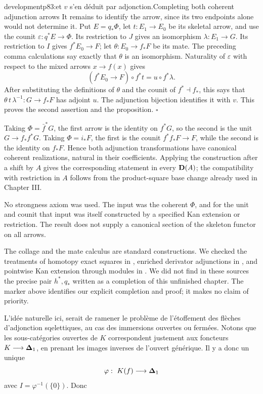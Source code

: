 \begin{dcomment}{development}{p83:et $v$ s'en déduit par adjonction.}{Completing both coherent adjunction arrows}
It remains to identify the arrow, since its two endpoints alone would not determine it. Put \(E=q_*\Phi\), let \(t:E_1\to E_0\) be its skeletal arrow, and use the counit
\(\varepsilon:q^*E\to\Phi\).
Its restriction to \(J\) gives an isomorphism \(\lambda:E_1\to G\). Its restriction to \(I\) gives \(f^*E_0\to F\); let \(\theta:E_0\to f_*F\) be its mate. The preceding comma calculations say exactly that \(\theta\) is an isomorphism. Naturality of \(\varepsilon\) with respect to the mixed arrows \(x\to f(x)\) gives
\[
 (f^*E_0\longrightarrow F)\circ f^*t
 =
 u\circ f^*\lambda.
\]
After substituting the definitions of \(\theta\) and the counit of \(f^*\dashv f_*\), this says that
\(\theta\,t\,\lambda^{-1}:G\to f_*F\)
has adjoint \(u\). The adjunction bijection identifies it with \(v\). This proves the second assertion and the proposition. \(\square\)

Taking \(\Phi=\bar f^*G\), the first arrow is the identity on \(f^*G\), so the second is the unit \(G\to f_*f^*G\). Taking \(\Phi=i_*F\), the first is the counit \(f^*f_*F\to F\), while the second is the identity on \(f_*F\). Hence both adjunction transformations have canonical coherent realizations, natural in their coefficients. Applying the construction after a shift by \(A\) gives the corresponding statement in every \(\mathbf{D}(A)\); the compatibility with restriction in \(A\) follows from the product-square base change already used in Chapter III.

No strongness axiom was used. The input was the coherent \(\Phi\), and for the unit and counit that input was itself constructed by a specified Kan extension or restriction. The result does not supply a canonical section of the skeleton functor on all arrows.

The collage and the mate calculus are standard constructions. We checked the treatments of homotopy exact squares in \citet[Section 1]{Groth2013}, enriched derivator adjunctions in \citet[Sections 8--9]{GrothPontoShulman2014Additivity}, and pointwise Kan extension through modules in \citet[Section 5]{RiehlVerity2017}. We did not find in these sources the precise pair \(h^*,q_*\) written as a completion of this unfinished chapter. The marker above identifies our explicit completion and proof; it makes no claim of priority.
\end{dcomment}


L'idée naturelle ici, serait de ramener le problème de l'étoffement des flèches d'adjonction sqelettiques, au cas des immersions ouvertes ou fermées. Notons que les sous-catégories ouvertes de $K$ correspondent justement aux foncteurs $K \longrightarrow \boldsymbol{\Delta}_1$, en prenant les images inverses de l'ouvert générique. Il y a donc un unique %
\[ \varphi :\ K(f) \longrightarrow \boldsymbol{\Delta}_1 \]
avec $I = \varphi^{-1}(\{0\})$. Donc

